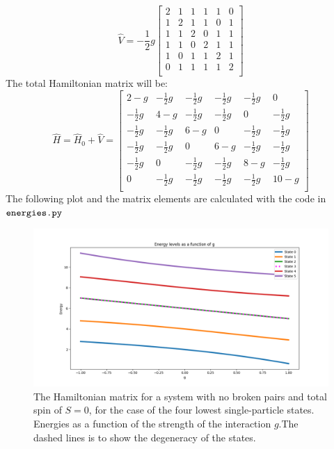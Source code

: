 \documentclass[a4paper,12pt]{article}
\begin{document}
$$
\hat{V} = -\frac{1}{2}g
\begin{bmatrix}
    2 & 1 & 1 & 1 & 1 & 0 \\
    1 & 2 & 1 & 1 & 0 & 1 \\
    1 & 1 & 2 & 0 & 1 & 1 \\
    1 & 1 & 0 & 2 & 1 & 1 \\
    1 & 0 & 1 & 1 & 2 & 1 \\
    0 & 1 & 1 & 1 & 1 & 2 \\
    \end{bmatrix}
$$
The total Hamiltonian matrix will be:
$$
\hat{H} = \hat{H}_0 + \hat{V} = 
\begin{bmatrix}
    2 - g & -\frac{1}{2}g & -\frac{1}{2}g & -\frac{1}{2}g & -\frac{1}{2}g & 0 \\
    -\frac{1}{2}g & 4 - g & -\frac{1}{2}g & -\frac{1}{2}g & 0 & -\frac{1}{2}g \\
    -\frac{1}{2}g & -\frac{1}{2}g & 6 - g & 0 & -\frac{1}{2}g & -\frac{1}{2}g \\
    -\frac{1}{2}g & -\frac{1}{2}g & 0 & 6 - g & -\frac{1}{2}g & -\frac{1}{2}g \\
    -\frac{1}{2}g & 0 & -\frac{1}{2}g & -\frac{1}{2}g & 8 - g & -\frac{1}{2}g \\
    0 & -\frac{1}{2}g & -\frac{1}{2}g & -\frac{1}{2}g & -\frac{1}{2}g & 10 - g \\
\end{bmatrix}
$$
The following plot and the matrix elements are calculated with the code in $ \verb|energies.py|$
\begin{figure}[h]
    \centering
    \includegraphics[scale = 0.5]{Figure_1.png}
    \caption{The Hamiltonian matrix for a system with no broken pairs and total spin of $S=0$, for the case of the four lowest single-particle states. Energies as a function of the strength of the interaction $g$.The dashed lines is to show the degeneracy of the states.}
    \label{fig:fig1}
\end{figure}
\end{document}
